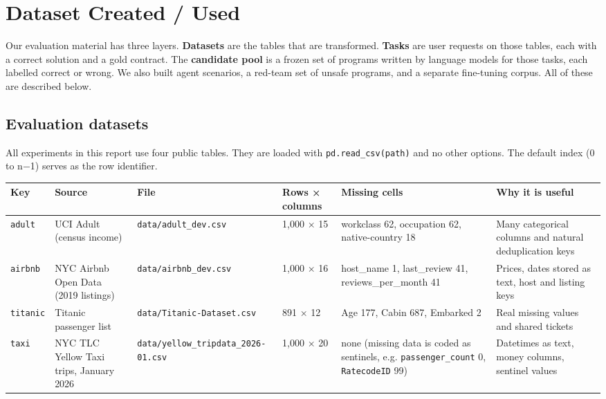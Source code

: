 \documentclass[11pt]{article}
\begin{document}
\section{Dataset Created / Used}

Our evaluation material has three layers. \textbf{Datasets} are the
tables that are transformed. \textbf{Tasks} are user requests on those
tables, each with a correct solution and a gold contract. The
\textbf{candidate pool} is a frozen set of programs written by language
models for those tasks, each labelled correct or wrong. We also built
agent scenarios, a red-team set of unsafe programs, and a separate
fine-tuning corpus. All of these are described below.

\subsection{Evaluation datasets}

All experiments in this report use four public tables. They are loaded
with \texttt{pd.\allowbreak{}read\_\allowbreak{}csv(path)} and no other
options. The default index (0 to n−1) serves as the row identifier.

\begin{table}[!tp]
\centering\footnotesize\setlength{\tabcolsep}{3pt}\renewcommand{\arraystretch}{1.1}
\begin{tabularx}{\textwidth}{l>{\raggedright\arraybackslash}Xll>{\raggedright\arraybackslash}X>{\raggedright\arraybackslash}X}
\toprule
\textbf{Key} & \textbf{Source} & \textbf{File} & \textbf{Rows × columns} & \textbf{Missing cells} & \textbf{Why it is useful} \\
\midrule
\texttt{adult} & UCI Adult (census income) & \texttt{data/\allowbreak{}adult\_\allowbreak{}dev.\allowbreak{}csv} & 1,000 × 15 & workclass 62, occupation 62, native-country 18 & Many categorical columns and natural deduplication keys \\
\texttt{airbnb} & NYC Airbnb Open Data (2019 listings) & \texttt{data/\allowbreak{}airbnb\_\allowbreak{}dev.\allowbreak{}csv} & 1,000 × 16 & host\_name 1, last\_review 41, reviews\_per\_month 41 & Prices, dates stored as text, host and listing keys \\
\texttt{titanic} & Titanic passenger list & \texttt{data/\allowbreak{}Titanic-Dataset.\allowbreak{}csv} & 891 × 12 & Age 177, Cabin 687, Embarked 2 & Real missing values and shared tickets \\
\texttt{taxi} & NYC TLC Yellow Taxi trips, January 2026 & \texttt{data/\allowbreak{}yellow\_\allowbreak{}tripdata\_\allowbreak{}2026-01.\allowbreak{}csv} & 1,000 × 20 & none (missing data is coded as sentinels, e.g. \texttt{passenger\_\allowbreak{}count} 0, \texttt{RatecodeID} 99) & Datetimes as text, money columns, sentinel values \\
\bottomrule
\end{tabularx}
\end{table}
\end{document}
